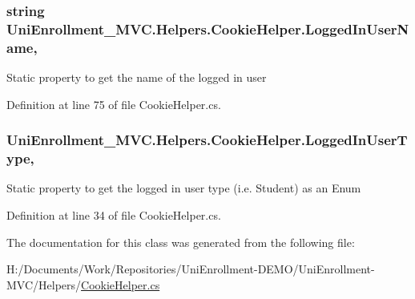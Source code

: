 \subsubsection[{\texorpdfstring{Logged\+In\+User\+Name}{LoggedInUserName}}]{\setlength{\rightskip}{0pt plus 5cm}string Uni\+Enrollment\+\_\+\+M\+V\+C.\+Helpers.\+Cookie\+Helper.\+Logged\+In\+User\+Name\hspace{0.3cm}{\ttfamily [static]}, {\ttfamily [get]}}\hypertarget{class_uni_enrollment___m_v_c_1_1_helpers_1_1_cookie_helper_af0868f61f0e84f2a35120248405109d9}{}\label{class_uni_enrollment___m_v_c_1_1_helpers_1_1_cookie_helper_af0868f61f0e84f2a35120248405109d9}


Static property to get the name of the logged in user 



Definition at line 75 of file Cookie\+Helper.\+cs.

\subsubsection[{\texorpdfstring{Logged\+In\+User\+Type}{LoggedInUserType}}]{ Uni\+Enrollment\+\_\+\+M\+V\+C.\+Helpers.\+Cookie\+Helper.\+Logged\+In\+User\+Type\hspace{0.3cm}{\ttfamily [static]}, {\ttfamily [get]}}\hypertarget{class_uni_enrollment___m_v_c_1_1_helpers_1_1_cookie_helper_a3399b7e7ec670f2bff2bc6ae2939fca1}{}\label{class_uni_enrollment___m_v_c_1_1_helpers_1_1_cookie_helper_a3399b7e7ec670f2bff2bc6ae2939fca1}


Static property to get the logged in user type (i.\+e. \textquotesingle{}Student\textquotesingle{}) as an Enum 



Definition at line 34 of file Cookie\+Helper.\+cs.



The documentation for this class was generated from the following file\+:\begin{DoxyCompactItemize}
\item 
H\+:/\+Documents/\+Work/\+Repositories/\+Uni\+Enrollment-\/\+D\+E\+M\+O/\+Uni\+Enrollment-\/\+M\+V\+C/\+Helpers/\hyperlink{_cookie_helper_8cs}{Cookie\+Helper.\+cs}\end{DoxyCompactItemize}
